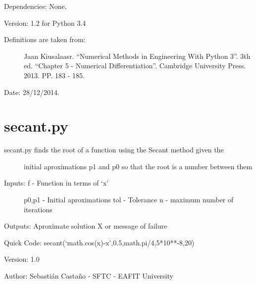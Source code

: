 \documentclass[letterpaper,10pt,oneside]{sphinxmanual}
\theoremstyle{plain}%
\theoremstyle{definition}%
\theoremstyle{remark}%
\begin{document}
Dependencies: None.

Version: 1.2 for Python 3.4
\begin{description}
\item[{Definitions are taken from:}] \leavevmode
Jaan Kiusalaasr. ``Numerical Methods in Engineering With Python 3''.
3th ed. ``Chapter 5 - Numerical Differentiation''. 
Cambridge University Press. 2013. PP. 183 - 185.

\end{description}




Date: 28/12/2014.


\section{secant.py}
\label{code:module-secant}\label{code:secant-py}\begin{description}
\item[{secant.py finds the root of a function using the Secant method given the}] \leavevmode
initial aproximations p1 and p0 so that the root is a number between them

\item[{Inputs: f - Function in terms of `x'}] \leavevmode
p0,p1 - Initial aproximations
tol - Tolerance
n - maximum number of iterations

\end{description}

Outputs: Aproximate solution X or message of failure

Quick Code: secant(`math.cos(x)-x',0.5,math.pi/4,5*10**-8,20)

Version: 1.0

Author: Sebastián Castaño - SFTC - EAFIT University
\end{document}
